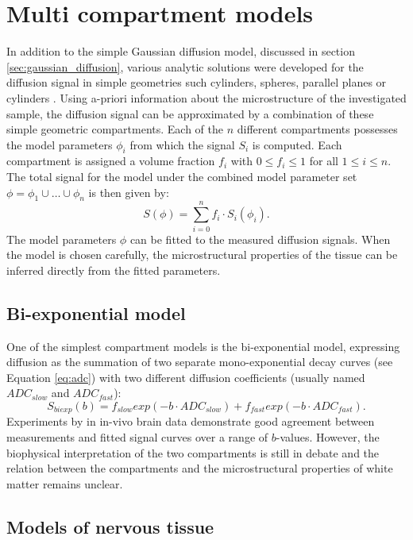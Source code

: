 \section{Multi compartment models}
\label{sec:multicompartment_modeling}
In addition to the simple Gaussian diffusion model, discussed in section \ref{sec:gaussian_diffusion}, various analytic solutions were developed for the diffusion signal in simple geometries such cylinders, spheres, parallel planes \citep{Balinov:1993, Linse:1995, Callaghan:1996} or cylinders \citep{Gelderen:1994}. Using a-priori information about the microstructure of the investigated sample, the diffusion signal can be approximated by a combination of these simple geometric compartments. Each of the $n$ different compartments possesses the model parameters $\phi_{i}$ from which the signal $S_i$ is computed. Each compartment is assigned a volume fraction $f_i$ with $0 \le f_i \le 1$ for all $1 \le i \le n$. The total signal for the model under the combined model parameter set $\phi=\phi_{1}\cup\dots\cup\phi_{n}$ is then given by:
\begin{equation}
	S(\phi)=\sum_{i=0}^{n}f_i\cdot S_i(\phi_i).
\end{equation}
The model parameters $\phi$ can be fitted to the measured diffusion signals. When the model is chosen carefully, the microstructural properties of the tissue  can be inferred directly from the fitted parameters.


\subsection*{Bi-exponential model}
One of the simplest compartment models is the bi-exponential model, expressing diffusion as the summation of two separate mono-exponential decay curves (see Equation \ref{eq:adc}) with two different diffusion coefficients (usually named $ADC_{slow}$ and $ADC_{fast}$):
\begin{equation}
	S_{biexp}(b) = f_{slow} exp(-b\cdot ADC_{slow}) + f_{fast} exp(-b\cdot ADC_{fast}).
\end{equation}
Experiments by \citet{Clark:2002} in in-vivo brain data demonstrate good agreement between measurements and fitted signal curves over a range of $b$-values. However, the biophysical interpretation of the two compartments is still in debate and the relation between the compartments and the microstructural properties of white matter remains unclear. 
\subsection*{Models of nervous tissue}
